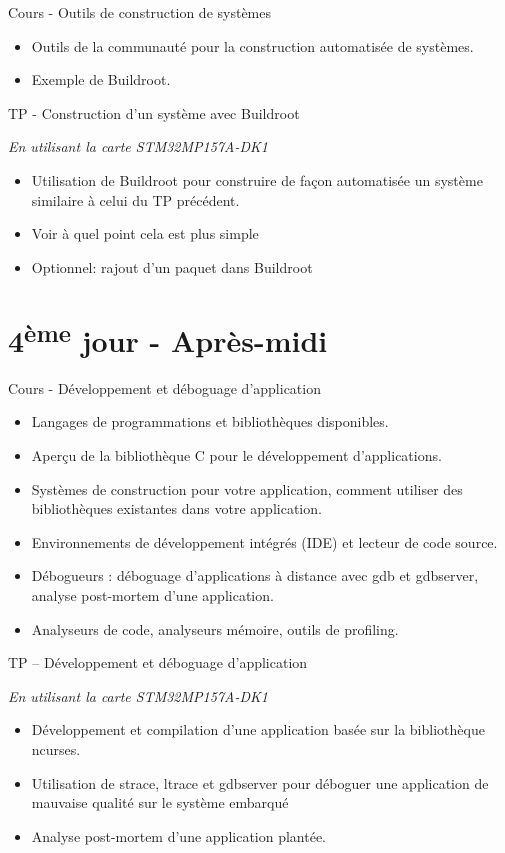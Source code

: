 \documentclass[a4paper,12pt,obeyspaces,spaces,hyphens]{article}
\begin{document}
\feagendatwocolumn
{Cours - Outils de construction de systèmes}
{
  \begin{itemize}
  \item Outils de la communauté pour la construction
	automatisée de systèmes.
  \item Exemple de Buildroot.
  \end{itemize}
}
{TP - Construction d'un système avec Buildroot}
{
  {\em En utilisant la carte STM32MP157A-DK1}
  \begin{itemize}
  \item Utilisation de Buildroot pour construire de façon automatisée
	un système similaire à celui du TP précédent.
  \item Voir à quel point cela est plus simple
  \item Optionnel: rajout d'un paquet dans Buildroot
  \end{itemize}
}

\section{4\textsuperscript{ème} jour - Après-midi}

\feagendaonecolumn
{Cours - Développement et déboguage d'application}
{
  \begin{itemize}
  \item Langages de programmations et bibliothèques disponibles.
  \item Aperçu de la bibliothèque C pour le développement d'applications.
  \item Systèmes de construction pour votre application, comment utiliser des
	bibliothèques existantes dans votre application.
  \item Environnements de développement intégrés (IDE) et lecteur de code source.
  \item Débogueurs : déboguage d'applications à distance avec gdb et gdbserver, analyse
	post-mortem d'une application.
  \item Analyseurs de code, analyseurs mémoire, outils de profiling.
  \end{itemize}
}

\feagendaonecolumn
{TP – Développement et déboguage d'application}
{
  {\em En utilisant la carte STM32MP157A-DK1}
  \begin{itemize}
  \item Développement et compilation d'une application basée sur la bibliothèque
	ncurses.
  \item Utilisation de strace, ltrace et gdbserver pour déboguer une application de
	mauvaise qualité sur le système embarqué
  \item Analyse post-mortem d'une application plantée.
  \end{itemize}
}
\end{document}

